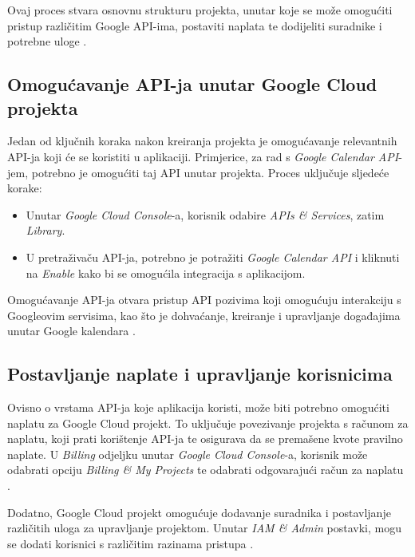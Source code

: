 \documentclass{foi}
\begin{document}
Ovaj proces stvara osnovnu strukturu projekta, unutar koje se može omogućiti pristup različitim Google API-ima, postaviti naplata te dodijeliti suradnike i potrebne uloge \cite{GoogleWorkspace2024}.

\subsection{Omogućavanje API-ja unutar Google Cloud projekta}

Jedan od ključnih koraka nakon kreiranja projekta je omogućavanje relevantnih API-ja koji će se koristiti u aplikaciji. Primjerice, za rad s \textit{Google Calendar API}-jem, potrebno je omogućiti taj API unutar projekta. Proces uključuje sljedeće korake:
\begin{itemize}
    \item Unutar \textit{Google Cloud Console}-a, korisnik odabire \textit{APIs \& Services}, zatim \textit{Library}.
    \item U pretraživaču API-ja, potrebno je potražiti \textit{Google Calendar API} i kliknuti na \textit{Enable} kako bi se omogućila integracija s aplikacijom.
\end{itemize}

Omogućavanje API-ja otvara pristup API pozivima koji omogućuju interakciju s Googleovim servisima, kao što je dohvaćanje, kreiranje i upravljanje događajima unutar Google kalendara \cite{GoogleWorkspace2024}.

\subsection{Postavljanje naplate i upravljanje korisnicima}

Ovisno o vrstama API-ja koje aplikacija koristi, može biti potrebno omogućiti naplatu za Google Cloud projekt. To uključuje povezivanje projekta s računom za naplatu, koji prati korištenje API-ja te osigurava da se premašene kvote pravilno naplate. U \textit{Billing} odjeljku unutar \textit{Google Cloud Console}-a, korisnik može odabrati opciju \textit{Billing \& My Projects} te odabrati odgovarajući račun za naplatu \cite{GoogleWorkspace2024}.

Dodatno, Google Cloud projekt omogućuje dodavanje suradnika i postavljanje različitih uloga za upravljanje projektom. Unutar \textit{IAM \& Admin} postavki, mogu se dodati korisnici s različitim razinama pristupa \cite{GoogleWorkspace2024}.
\end{document}
